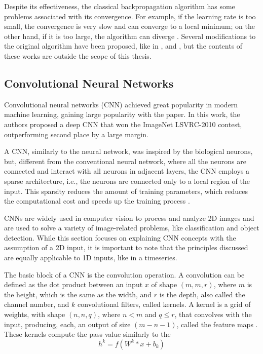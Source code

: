 Despite its effectiveness, the classical backpropagation algorithm has some problems associated with its convergence. For example, if the learning rate is too small, the convergence is very slow and can converge to a local minimum; on the other hand, if it is too large, the algorithm can diverge \cite{ruder2016overview}. Several modifications to the original algorithm have been proposed, like in \cite{QIAN1999145}, \cite{1370017282431050757} and \cite{kingma2017adammethodstochasticoptimization}, but the contents of these works are outside the scope of this thesis. 

\subsection{Convolutional Neural Networks} \label{section-CNN}
Convolutional neural networks (CNN) achieved great popularity in modern machine learning, gaining large popularity with the \cite{NIPS2012_c399862d} paper. In this work, the authors proposed a deep CNN that won the ImageNet LSVRC-2010 contest, outperforming second place by a large margin. 

A CNN, similarly to the neural network, was inspired by the biological neurons, but, different from the conventional neural network, where all the neurons are connected and interact with all neurons in adjacent layers, the CNN employs a sparse architecture, i.e., the neurons are connected only to a local region of the input. This sparsity reduces the amount of training parameters, which reduces the computational cost and speeds up the training process \cite{Alzubaidi_Zhang_Humaidi_Al_Dujaili_Duan_Al_Shamma_Santamaria_Fadhel_Al_Amidie_Farhan_2021, 9451544}. 

CNNs are widely used in computer vision to process and analyze 2D images and are used to solve a variety of image-related problems, like classification and object detection. While this section focuses on explaining CNN concepts with the assumption of a 2D input, it is important to note that the principles discussed are equally applicable to 1D inputs, like in a timeseries.

The basic block of a CNN is the convolution operation. A convolution can be defined as the dot product between an input $x$ of shape $(m,m,r)$, where $m$ is the height, which is the same as the width, and $r$ is the depth, also called the channel number, and $k$ convolutional filters, called kernels. A kernel is a grid of weights, with shape $(n,n, q)$, where $n < m$ and $q \leq r$, that convolves with the input, producing, each, an output of size $(m-n-1)$, called the feature maps \cite{Alzubaidi_Zhang_Humaidi_Al_Dujaili_Duan_Al_Shamma_Santamaria_Fadhel_Al_Amidie_Farhan_2021}. These kernels compute the pass value similarly to the 
\begin{equation}
    h^k = f\left(W^k * x + b_k\right)
\end{equation}

